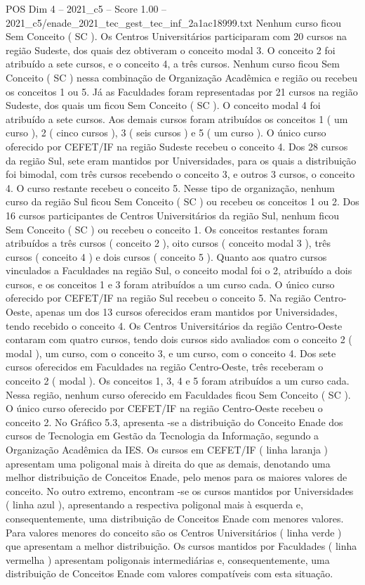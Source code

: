 \begin{textsample}{POS Dim 4 – 2021\_c5 – Score 1.00 – 2021\_c5/enade\_2021\_tec\_gest\_tec\_inf\_2a1ac18999.txt}
Nenhum curso ficou Sem Conceito ( SC ).
Os Centros Universitários participaram com 20 cursos na região Sudeste, dos quais dez obtiveram o conceito modal 3.
O conceito 2 foi atribuído a sete cursos, e o conceito 4, a três cursos.
Nenhum curso ficou Sem Conceito ( SC ) nessa combinação de Organização Acadêmica e região ou recebeu os conceitos 1 ou 5.
Já as Faculdades foram representadas por 21 cursos na região Sudeste, dos quais um ficou Sem Conceito ( SC ).
O conceito modal 4 foi atribuído a sete cursos.
Aos demais cursos foram atribuídos os conceitos 1 ( um curso ), 2 ( cinco cursos ), 3 ( seis cursos ) e 5 ( um curso ).
O único curso oferecido por CEFET/IF na região Sudeste recebeu o conceito 4.
Dos 28 cursos da região Sul, sete eram mantidos por Universidades, para os quais a distribuição foi bimodal, com três cursos recebendo o conceito 3, e outros 3 cursos, o conceito 4.
O curso restante recebeu o conceito 5.
Nesse tipo de organização, nenhum curso da região Sul ficou Sem Conceito ( SC ) ou recebeu os conceitos 1 ou 2.
Dos 16 cursos participantes de Centros Universitários da região Sul, nenhum ficou Sem Conceito ( SC ) ou recebeu o conceito 1.
Os conceitos restantes foram atribuídos a três cursos ( conceito 2 ), oito cursos ( conceito modal 3 ), três cursos ( conceito 4 ) e dois cursos ( conceito 5 ).
Quanto aos quatro cursos vinculados a Faculdades na região Sul, o conceito modal foi o 2, atribuído a dois cursos, e os conceitos 1 e 3 foram atribuídos a um curso cada.
O único curso oferecido por CEFET/IF na região Sul recebeu o conceito 5.
Na região Centro-Oeste, apenas um dos 13 cursos oferecidos eram mantidos por Universidades, tendo recebido o conceito 4.
Os Centros Universitários da região Centro-Oeste contaram com quatro cursos, tendo dois cursos sido avaliados com o conceito 2 ( modal ), um curso, com o conceito 3, e um curso, com o conceito 4.
Dos sete cursos oferecidos em Faculdades na região Centro-Oeste, três receberam o conceito 2 ( modal ).
Os conceitos 1, 3, 4 e 5 foram atribuídos a um curso cada.
Nessa região, nenhum curso oferecido em Faculdades ficou Sem Conceito ( SC ).
O único curso oferecido por CEFET/IF na região Centro-Oeste recebeu o conceito 2.
No Gráfico 5.3, apresenta -se a distribuição do Conceito Enade dos cursos de Tecnologia em Gestão da Tecnologia da Informação, segundo a Organização Acadêmica da IES.
Os cursos em CEFET/IF ( linha laranja ) apresentam uma poligonal mais à direita do que as demais, denotando uma melhor distribuição de Conceitos Enade, pelo menos para os maiores valores de conceito.
No outro extremo, encontram -se os cursos mantidos por Universidades ( linha azul ), apresentando a respectiva poligonal mais à esquerda e, consequentemente, uma distribuição de Conceitos Enade com menores valores.
Para valores menores do conceito são os Centros Universitários ( linha verde ) que apresentam a melhor distribuição.
Os cursos mantidos por Faculdades ( linha vermelha ) apresentam poligonais intermediárias e, consequentemente, uma distribuição de Conceitos Enade com valores compatíveis com esta situação.

\end{textsample}
